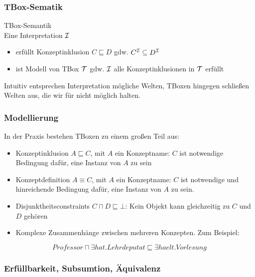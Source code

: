 \subsubsection{TBox-Sematik}\label{tboxsemantik}

\begin{definition}{TBox-Semantik} \\
Eine Interpretation $\mathcal{I}$
\begin{itemize}
\item
  erfüllt Konzeptinklusion $C \sqsubseteq D$ gdw.
  $C^{\mathcal{I}} \subseteq D^{\mathcal{I}}$
\item
  ist Modell von TBox $\mathcal{T}$ gdw. $\mathcal{I}$ alle Konzeptinklusionen in $\mathcal{T}$
  erfüllt
\end{itemize}
\end{definition}

Intuitiv entsprechen Interpretation mögliche Welten, TBoxen hingegen schließen Welten aus, die wir für nicht möglich halten.

\subsubsection{Modellierung}\label{modellierung}

In der Praxis bestehen TBoxen zu einem großen Teil aus:

\begin{itemize}
\item Konzeptinklusion $A \sqsubseteq C$, mit $A$ ein Konzeptname: $C$ ist notwendige Bedingung dafür, eine Instanz von $A$ zu sein
\item Konzeptdefinition $A \equiv C$, mit $A$ ein Konzeptname: $C$ ist notwendige und hinreichende Bedingung dafür, eine Instanz von $A$ zu sein.
\item Disjunktheitsconstraints $C \sqcap D \sqsubseteq \bot$: Kein Objekt kann gleichzeitig zu $C$ und $D$ gehören
\item Komplexe Zusammenhänge zwischen mehreren Konzepten. Zum Beispiel:
\end{itemize}

$$Professor \sqcap \exists hat.Lehrdeputat \sqsubseteq \exists haelt.Vorlesung$$

\subsubsection{Erfüllbarkeit, Subsumtion, Äquivalenz}\label{erfuxfcllbarkeit-subsumtion-uxe4quivalenz-1}

